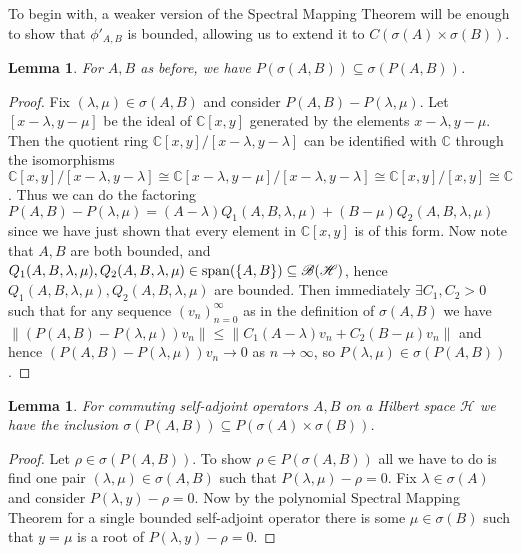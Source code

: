 \documentclass[12pt,oneside]{report}
\newtheorem{lem}[thm]{Lemma}
\begin{document}
To begin with, a weaker version of the Spectral Mapping Theorem will be enough to show that $\phi'_{A,B}$ is bounded, allowing us to extend it to $C(\sigma(A) \times \sigma(B))$.

\begin{lem}\label{psigma-sigmap}
    For $A,B$ as before, we have $P(\sigma(A,B)) \subseteq \sigma(P(A,B))$.
\end{lem}
\begin{proof}
    Fix $(\lambda,\mu) \in \sigma(A,B)$ and consider $P(A,B) - P(\lambda, \mu)$. Let $[x - \lambda, y - \mu]$ be the ideal of $\mathbb{C}[x, y]$ generated by the elements $x - \lambda, y - \mu$. Then the quotient ring $\mathbb{C}[x,y]/[x - \lambda, y - \lambda]$ can be identified with $\mathbb{C}$ through the isomorphisms $\mathbb{C}[x,y]/[x - \lambda, y - \lambda] \cong \mathbb{C}[x - \lambda, y - \mu]/[x - \lambda, y - \lambda] \cong \mathbb{C}[x,y]/[x, y] \cong \mathbb{C}$. Thus we can do the factoring $P(A,B) - P(\lambda, \mu) = (A - \lambda)Q_{1}(A,B,\lambda,\mu) + (B - \mu)Q_{2}(A,B,\lambda,\mu)$ since we have just shown that every element in $\mathbb{C}[x,y]$ is of this form. Now note that $A,B$ are both bounded, and $Q_{1}(A,B,\lambda,\mu), Q_{2}(A,B,\lambda,\mu) \in \mathrm{span}(\{ A,B \}) \subseteq \mathscr{B}(\mathscr{H})$, hence $Q_{1}(A,B,\lambda,\mu),Q_{2}(A,B,\lambda,\mu)$ are bounded. Then immediately $\exists C_{1},C_{2} > 0$ such that for any sequence $(v_{n})_{n=0}^{\infty}$ as in the definition of $\sigma(A,B)$ we have $\|(P(A,B) - P(\lambda,\mu))v_{n}\| \leq \|C_{1}(A-\lambda)v_{n} + C_{2}(B-\mu)v_{n}\|$ and hence $(P(A,B) - P(\lambda,\mu))v_{n} \to 0$ as $n \to \infty$, so $P(\lambda,\mu) \in \sigma(P(A,B))$.
\end{proof}

\begin{lem}\label{sigmap-psigma}
    For commuting self-adjoint operators $A,B$ on a Hilbert space $\mathscr{H}$ we have the inclusion $\sigma(P(A,B)) \subseteq P(\sigma(A) \times \sigma(B))$.
\end{lem}
\begin{proof}
    Let $\rho \in \sigma(P(A,B))$. To show $\rho \in P(\sigma(A,B))$ all we have to do is find one pair $(\lambda,\mu) \in \sigma(A,B)$ such that $P(\lambda,\mu) - \rho = 0$. Fix $\lambda \in \sigma(A)$ and consider $P(\lambda,y) - \rho = 0$. Now by the polynomial Spectral Mapping Theorem for a single bounded self-adjoint operator there is some $\mu \in \sigma(B)$ such that $y = \mu$ is a root of $P(\lambda,y) - \rho = 0$.
\end{proof}
\end{document}
